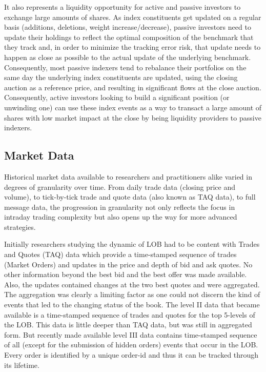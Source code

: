 It also represents a liquidity opportunity for active and passive investors to exchange large amounts of shares. As index constituents get updated on a regular basis (additions, deletions, weight increase/decrease), passive investors need to update their holdings to reflect the optimal composition of the benchmark that they track and, in order to minimize the tracking error risk, that update needs to happen as close as possible to the actual update of the underlying benchmark. Consequently, most passive indexers tend to rebalance their portfolios on the same day the underlying index constituents are updated, using the closing auction as a reference price, and resulting in significant flows at the close auction. Consequently, active investors looking to build a significant position (or unwinding one) can use these index events as a way to transact a large amount of shares with low market impact at the close by being liquidity providers to passive indexers.  



\subsection{Market Data}



Historical market data available to researchers and practitioners alike varied in degrees of granularity over time. From daily trade data (closing price and volume), to tick-by-tick trade and quote data (also known as TAQ data), to full message data, the progression in granularity not only reflects the focus in intraday trading complexity but also opens up the way for more advanced strategies. 


Initially researchers studying the dynamic of LOB had to be content with Trades and Quotes (TAQ) data which provide a time-stamped sequence of trades (Market Orders) and updates in the price and depth of bid and ask quotes. No other information beyond the best bid and the best offer was made available. Also, the updates contained changes at the two best quotes and were aggregated. The aggregation was clearly a limiting factor as one could not discern the kind of events that led to the changing status of the book. The level II data that became available is a time-stamped sequence of trades and quotes for the top 5-levels of the LOB. This data is little deeper than TAQ data, but was still in aggregated form. But recently made available level III data contains time-stamped sequence of all (except for the submission of hidden orders) events that occur in the LOB. Every order is identified by a unique order-id and thus it can be tracked through its lifetime. \\


